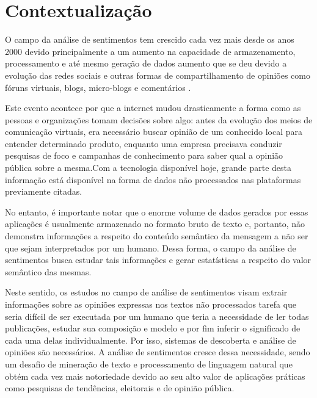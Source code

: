 \section{Contextualização}
\label{sec:sec1}
O campo da análise de sentimentos tem crescido cada vez mais desde os anos 2000 devido principalmente a um aumento na capacidade de armazenamento, processamento e até mesmo geração de dados aumento que se deu devido a evolução das redes sociais e outras formas de compartilhamento de opiniões como fóruns virtuais, blogs, micro-blogs e comentários \cite{LiuBing, LiuSentAnaSubject}.
\par
Este evento acontece por que a internet mudou drasticamente a forma como as pessoas e organizações tomam decisões sobre algo: antes da evolução dos meios de comunicação virtuais, era necessário buscar opinião de um conhecido local para entender determinado produto, enquanto uma empresa precisava conduzir pesquisas de foco e campanhas de conhecimento para saber qual a opinião pública sobre a mesma.Com a tecnologia disponível hoje, grande parte desta informação está disponível na forma de dados não processados nas plataformas previamente citadas. \cite{LiuSentAnaSubject} \par 

No entanto, é importante notar que o enorme volume de dados gerados por essas aplicações é usualmente armazenado no formato bruto de texto e, portanto, não demonstra informações a respeito do conteúdo semântico da mensagem a não ser que sejam interpretados por um humano. Dessa forma, o campo da análise de sentimentos busca estudar tais informações e gerar estatísticas a respeito do valor semântico das mesmas.\cite{LiuBing} \par

Neste sentido, os estudos no campo de análise de sentimentos visam extrair informações sobre as opiniões expressas nos textos não processados tarefa que seria difícil de ser executada por um humano que teria a necessidade de ler todas publicações, estudar sua composição e modelo e por fim inferir o significado de cada uma delas individualmente. Por isso, sistemas de descoberta e análise de opiniões são necessários. A análise de sentimentos cresce dessa necessidade, sendo um desafio de mineração de texto e processamento de linguagem natural que obtém cada vez mais notoriedade devido ao seu alto valor de aplicações práticas como pesquisas de tendências, eleitorais e de opinião pública. \cite{LiuSentAnaSubject} 

\par
